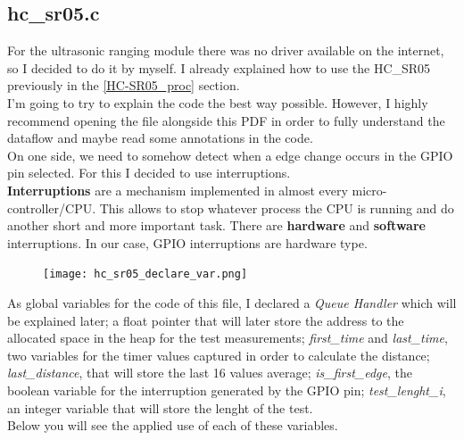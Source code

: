 \documentclass[14pt]{article}
\begin{document}
\begin{normalsize}
		\subsection{hc\_sr05.c}
		For the ultrasonic ranging module there was no driver available on the internet, so I decided to do it by myself. I already explained how to use the HC\_SR05 previously in the \ref{HC-SR05_proc} section.\\
		
		I'm going to try to explain the code the best way possible. However, I highly recommend opening the file alongside this PDF in order to fully understand the dataflow and maybe read some annotations in the code.\\
		
		On one side, we need to somehow detect when a edge change occurs in the GPIO pin selected. For this I decided to use interruptions.\\
		
		\textbf{Interruptions} are a mechanism implemented in almost every micro-controller/CPU. This allows to stop whatever process the CPU is running and do another short and more important task. There are \textbf{hardware} and \textbf{software} interruptions. In our case, GPIO interruptions are hardware type.\vspace{5pt}\\
		
		\setlength{\intextsep}{-10pt}
		\begin{figure}
			\begin{center}
				\texttt{[image: hc\_sr05\_declare\_var.png]}
			\end{center}
		\end{figure}
		As global variables for the code of this file, I declared a \textit{Queue Handler} which will be explained later; a float pointer that will later store the address to the allocated space in the heap for the test measurements; \textit{first\_time} and \textit{last\_time}, two variables for the timer values captured in order to calculate the distance; \textit{last\_distance}, that will store the last 16 values average; \textit{is\_first\_edge}, the boolean variable for the interruption generated by the GPIO pin; \textit{test\_lenght\_i}, an integer variable that will store the lenght of the test.\\
		
		\noindent Below you will see the applied use of each of these variables.\vspace{20pt}\\
		

\end{normalsize}
\end{document}

